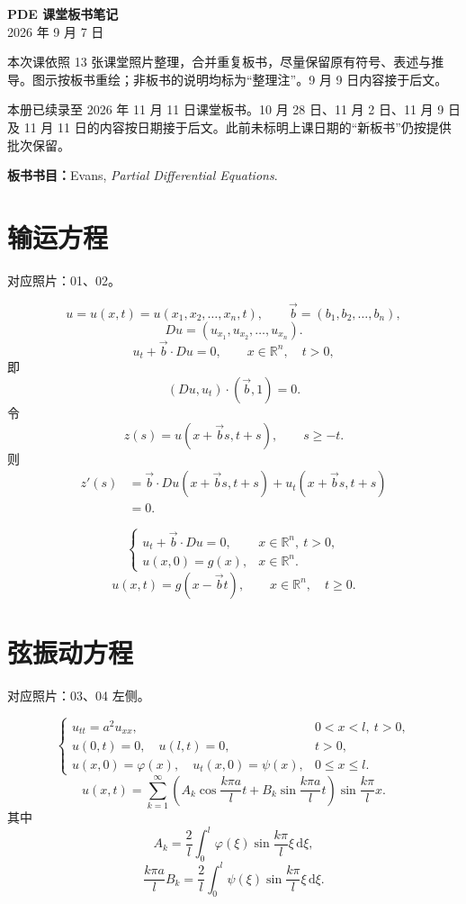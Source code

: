 \documentclass[UTF8,a4paper,11pt,fontset=fandol]{ctexart}
\newcommand{\R}{\mathbb R}
\newcommand{\dd}{\,\mathrm d}
\newcommand{\source}[1]{{\small\color{notegray}对应照片：#1。}\par}
\begin{document}
\begin{center}
  {\LARGE\bfseries PDE 课堂板书笔记}\\[5pt]
  {2026 年 9 月 7 日}
\end{center}
{\small 本次课依照 13 张课堂照片整理，合并重复板书，尽量保留原有符号、表述与推导。图示按板书重绘；非板书的说明均标为“整理注”。9 月 9 日内容接于后文。}
\par{\small\color{notegray}本册已续录至 2026 年 11 月 11 日课堂板书。10 月 28 日、11 月 2 日、11 月 9 日及 11 月 11 日的内容按日期接于后文。此前未标明上课日期的“新板书”仍按提供批次保留。}

\textbf{板书书目：}Evans, \textit{Partial Differential Equations}.

\section{输运方程}
\source{01、02}
\[
u=u(x,t)=u(x_1,x_2,\ldots,x_n,t),\qquad
\vec b=(b_1,b_2,\ldots,b_n),
\]
\[
Du=(u_{x_1},u_{x_2},\ldots,u_{x_n}).
\]
\[
u_t+\vec b\cdot Du=0,\qquad x\in\R^n,\quad t>0,
\]
即
\[
(Du,u_t)\cdot(\vec b,1)=0.
\]
令
\[
z(s)=u(x+\vec b s,t+s),\qquad s\geq -t.
\]
则
\[
\begin{aligned}
z'(s)
&=\vec b\cdot Du(x+\vec b s,t+s)
  +u_t(x+\vec b s,t+s)\\
&=0.
\end{aligned}
\]
\begin{center}
\end{center}
\[
\begin{cases}
u_t+\vec b\cdot Du=0,&x\in\R^n,\ t>0,\\
u(x,0)=g(x),&x\in\R^n.
\end{cases}
\]
\[
\boxed{u(x,t)=g(x-\vec b t),\qquad x\in\R^n,\quad t\geq0.}
\]

\newpage
\section{弦振动方程}
\source{03、04 左侧}
\[
\begin{cases}
u_{tt}=a^2u_{xx},&0<x<l,\ t>0,\\
u(0,t)=0,\quad u(l,t)=0,&t>0,\\
u(x,0)=\varphi(x),\quad u_t(x,0)=\psi(x),&0\leq x\leq l.
\end{cases}
\tag{IBP}
\]
\[
u(x,t)=\sum_{k=1}^{\infty}
\left(A_k\cos\frac{k\pi a}{l}t+B_k\sin\frac{k\pi a}{l}t\right)
\sin\frac{k\pi}{l}x.
\tag{$\triangle$}
\]
其中
\[
A_k=\frac{2}{l}\int_0^l\varphi(\xi)\sin\frac{k\pi}{l}\xi\dd\xi,
\]
\[
\frac{k\pi a}{l}B_k
=\frac{2}{l}\int_0^l\psi(\xi)\sin\frac{k\pi}{l}\xi\dd\xi.
\]
\end{document}
